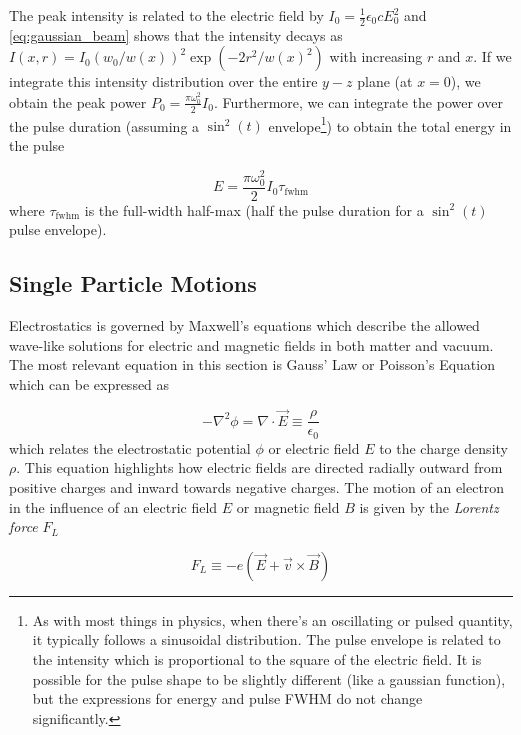 The peak intensity is related to the electric field by $I_0 = \frac{1}{2} \epsilon_0 c E_0^2$ and \cref{eq:gaussian_beam} shows that the intensity decays as $I(x, r) = I_0 (w_0 / w(x))^2 \exp(-2 r^2 / w(x)^2)$ with increasing $r$ and $x$. If we integrate this intensity distribution over the entire $y-z$ plane (at $x=0$), we obtain the peak power $P_0 = \frac{\pi \omega_0^2}{2} I_0$. Furthermore, we can integrate the power over the pulse duration (assuming a $\sin^2(t)$ envelope\footnote{As with most things in physics, when there's an oscillating or pulsed quantity, it typically follows a sinusoidal distribution. The pulse envelope is related to the intensity which is proportional to the square of the electric field. It is possible for the pulse shape to be slightly different (like a gaussian function), but the expressions for energy and pulse \gls{FWHM} do not change significantly.}) to obtain the total energy in the pulse 

\begin{equation}
	E = \frac{\pi \omega_0^2}{2} I_0 \tau_\text{fwhm} \label{eq:gaussian_beam_energy}
\end{equation}
where $\tau_\text{fwhm}$ is the full-width half-max (half the pulse duration for a $\sin^2(t)$ pulse envelope). 

\subsection{Single Particle Motions}

Electrostatics is governed by Maxwell's equations which describe the allowed wave-like solutions for electric and magnetic fields in both matter and vacuum. The most relevant equation in this section is Gauss' Law or Poisson's Equation which can be expressed as 

\begin{equation}
	- \nabla^2 \phi = \nabla \cdot \vec{E} \equiv \frac{\rho}{\epsilon_0} \label{eq:poisson}
\end{equation}
which relates the electrostatic potential $\phi$ or electric field $E$ to the charge density $\rho$. This equation highlights how electric fields are directed radially outward from positive charges and inward towards negative charges. The motion of an electron in the influence of an electric field $E$ or magnetic field $B$ is given by the \emph{Lorentz force} $F_L$

\begin{equation}
	F_L \equiv -e (\vec{E} + \vec{v} \times \vec{B}) \label{eq:lorentz}
\end{equation}

